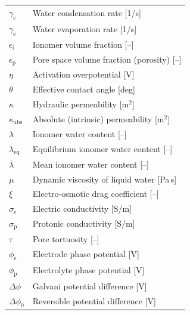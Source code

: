 \documentclass[fontsize=9pt,DIV=calc,a4paper,twocolumn]{scrartcl}
\begin{document}
\begin{xtabular}{@{}ll@{}}
$\gamma_\mathrm{c}$ & Water condensation rate [1/s]\\
$\gamma_\mathrm{e}$ & Water evaporation rate [1/s]\\
$\epsilon_\mathrm{i}$ & Ionomer volume fraction [--]\\
$\epsilon_\mathrm{p}$ & Pore space volume fraction (porosity) [--]\\
$\eta$ & Activation overpotential [V]\\
$\theta$ & Effective contact angle [deg]\\
$\kappa$ & Hydraulic permeability [m$^2$]\\
$\kappa_\mathrm{abs}$ & Absolute (intrinsic) permeability [m$^2$]\\
$\lambda$ & Ionomer water content [--]\\
$\lambda_\mathrm{eq}$ & Equilibrium ionomer water content [--]\\
$\overline{\lambda}$ & Mean ionomer water content [--]\\
$\mu$ & Dynamic viscosity of liquid water [Pa\,s]\\
$\xi$ & Electro-osmotic drag coefficient [--]\\
$\sigma_\mathrm{e}$ & Electric conductivity [S/m]\\
$\sigma_\mathrm{p}$ & Protonic conductivity [S/m]\\
$\tau$ & Pore tortuosity [--]\\
$\phi_\mathrm{e}$ & Electrode phase potential [V]\\
$\phi_\mathrm{p}$ & Electrolyte phase potential [V]\\
$\Delta\phi$ & Galvani potential difference [V]\\
$\Delta\phi_0$ & Reversible potential difference [V]\\
\end{xtabular}
\end{document}
